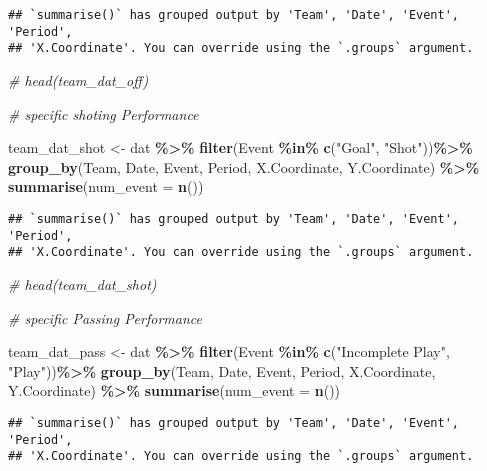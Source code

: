 \documentclass[
  a3paper,
]{article}
\newenvironment{Shaded}{\begin{snugshade}}{\end{snugshade}}
\newcommand{\AttributeTok}[1]{\textcolor[rgb]{0.13,0.29,0.53}{#1}}
\newcommand{\CommentTok}[1]{\textcolor[rgb]{0.56,0.35,0.01}{\textit{#1}}}
\newcommand{\FunctionTok}[1]{\textcolor[rgb]{0.13,0.29,0.53}{\textbf{#1}}}
\newcommand{\NormalTok}[1]{#1}
\newcommand{\OtherTok}[1]{\textcolor[rgb]{0.56,0.35,0.01}{#1}}
\newcommand{\SpecialCharTok}[1]{\textcolor[rgb]{0.81,0.36,0.00}{\textbf{#1}}}
\newcommand{\StringTok}[1]{\textcolor[rgb]{0.31,0.60,0.02}{#1}}
\begin{document}
\begin{verbatim}
## `summarise()` has grouped output by 'Team', 'Date', 'Event', 'Period',
## 'X.Coordinate'. You can override using the `.groups` argument.
\end{verbatim}

\begin{Shaded}
\begin{Highlighting}[]
\CommentTok{\# head(team\_dat\_off)}

\CommentTok{\# specific shoting Performance}

\NormalTok{team\_dat\_shot }\OtherTok{\textless{}{-}}\NormalTok{  dat }\SpecialCharTok{\%\textgreater{}\%}
  \FunctionTok{filter}\NormalTok{(Event }\SpecialCharTok{\%in\%} \FunctionTok{c}\NormalTok{(}\StringTok{"Goal"}\NormalTok{, }\StringTok{"Shot"}\NormalTok{))}\SpecialCharTok{\%\textgreater{}\%} 
  \FunctionTok{group\_by}\NormalTok{(Team, Date, Event, Period, X.Coordinate, Y.Coordinate) }\SpecialCharTok{\%\textgreater{}\%} 
  \FunctionTok{summarise}\NormalTok{(}\AttributeTok{num\_event =} \FunctionTok{n}\NormalTok{())}
\end{Highlighting}
\end{Shaded}

\begin{verbatim}
## `summarise()` has grouped output by 'Team', 'Date', 'Event', 'Period',
## 'X.Coordinate'. You can override using the `.groups` argument.
\end{verbatim}

\begin{Shaded}
\begin{Highlighting}[]
\CommentTok{\# head(team\_dat\_shot)}


\CommentTok{\# specific Passing Performance}

\NormalTok{team\_dat\_pass }\OtherTok{\textless{}{-}}\NormalTok{  dat }\SpecialCharTok{\%\textgreater{}\%}
  \FunctionTok{filter}\NormalTok{(Event }\SpecialCharTok{\%in\%} \FunctionTok{c}\NormalTok{(}\StringTok{"Incomplete Play"}\NormalTok{, }\StringTok{"Play"}\NormalTok{))}\SpecialCharTok{\%\textgreater{}\%}
  \FunctionTok{group\_by}\NormalTok{(Team, Date, Event, Period, X.Coordinate, Y.Coordinate) }\SpecialCharTok{\%\textgreater{}\%} 
  \FunctionTok{summarise}\NormalTok{(}\AttributeTok{num\_event =} \FunctionTok{n}\NormalTok{())}
\end{Highlighting}
\end{Shaded}

\begin{verbatim}
## `summarise()` has grouped output by 'Team', 'Date', 'Event', 'Period',
## 'X.Coordinate'. You can override using the `.groups` argument.
\end{verbatim}
\end{document}
